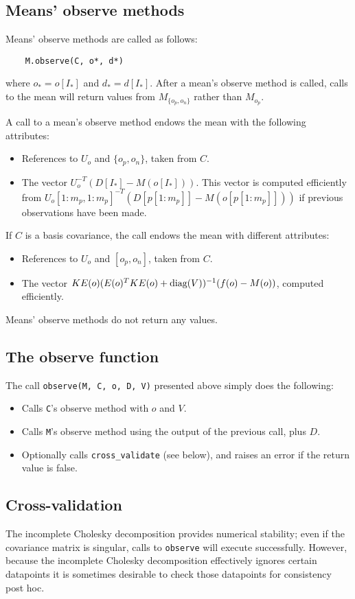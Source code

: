 \documentclass{report}
\begin{document}
\subsection{Means' observe methods}
Means' observe methods are called as follows:
\begin{verbatim}
    M.observe(C, o*, d*)
\end{verbatim}
where $o_*=o[{I_*}]$ and $d_*=d[{I_*}]$. After a mean's observe method is called, calls to the mean will return values from $M_{\{o_p, o_n\}}$ rather than $M_{o_p}$.

A call to a mean's observe method endows the mean with the following attributes:
\begin{itemize}
        \item References to $U_o$ and $\{o_p, o_n\}$, taken from $C$.
        \item The vector $U_o^{-T} (D[I_*] - M(o[I_*]))$. This vector is computed efficiently from $U_o[1:m_p,1:m_p]^{-T} (D[p[1:m_p]] - M(o[p[1:m_p]]))$ if previous observations have been made.
\end{itemize}

If $C$ is a basis covariance, the call endows the mean with different attributes:
\begin{itemize}
    \item References to $U_o$ and $[o_p, o_n]$, taken from $C$.
    \item The vector $KE(o)(E(o)^TKE(o) + \textup{diag}(V))^{-1}(f(o)-M(o))$, computed efficiently.
\end{itemize}

Means' observe methods do not return any values.

\subsection{The observe function}
The call \texttt{observe(M, C, o, D, V)} presented above simply does the following:
\begin{itemize}
    \item Calls \texttt{C}'s observe method with $o$ and $V$.
    \item Calls \texttt{M}'s observe method using the output of the previous call, plus $D$.
    \item Optionally calls \texttt{cross\_validate} (see below), and raises an error if the return value is false.
\end{itemize}

\subsection{Cross-validation}
The incomplete Cholesky decomposition provides numerical stability; even if the covariance matrix is singular, calls to \texttt{observe} will execute successfully. However, because the incomplete Cholesky decomposition effectively ignores certain datapoints it is sometimes desirable to check those datapoints for consistency post hoc. 
\end{document}
